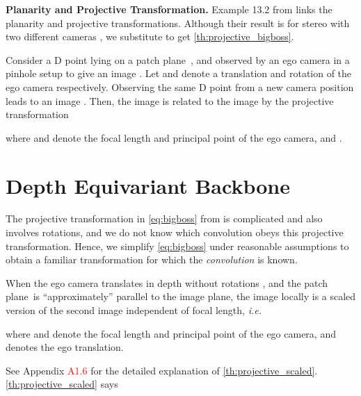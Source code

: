 \documentclass[runningheads]{llncs}
\newcommand{\threeD}{D}
\newcommand{\Equivariant} {Equivariant}
\newcommand{\DepthEquivariant} {Depth \Equivariant}
\newcommand{\plane}{patch plane}
\newcommand{\transformation}{transformation}
\newcommand{\thatIs}{\textit{i.e.}}
\newcommand{\noIndentHeading}[1]{\noindent\textbf{#1}}
\newcommand{\refSupApp}[1]{Appendix \textcolor{red}{A#1}}
\begin{document}
\noIndentHeading{Planarity and Projective Transformation.}                              
        Example 13.2 from \cite{hartley2003multiple} links the planarity and projective transformations.
        Although their result is for stereo with two different cameras , we substitute  to get \cref{th:projective_bigboss}. 
        \begin{theorem}\label{th:projective_bigboss}\cite{hartley2003multiple}
            Consider a \threeD{} point lying on a \plane~, and observed by an ego camera in a pinhole setup to give an image . 
            Let  and  denote a translation and rotation of the ego camera respectively. 
            Observing the same \threeD{} point from a new camera position leads to an image . 
            Then, the image  is related to the image  by the projective \transformation{} 
            
             where  and  denote the 
            focal length and principal point of the ego camera, and  . 
        \end{theorem}



\section{\DepthEquivariant{} Backbone}\label{sec:proposed}
    The projective transformation in \cref{eq:bigboss} from \cite{hartley2003multiple} is complicated and also involves rotations, and we do not know which convolution obeys this projective \transformation. 
    Hence, we simplify \cref{eq:bigboss} under reasonable assumptions to obtain a familiar \transformation{} for which the \textit{convolution} is known.
        \begin{corollary}\label{th:projective_scaled}
When the ego camera translates in depth without rotations 
            ,
            and the \plane~is ``approximately'' parallel to the image plane, the image  locally is a scaled version of the second image  independent of focal length, \thatIs
            
            where  and  denote the 
            focal length and principal point of the ego camera, and  denotes the ego translation.
        \end{corollary}
See \refSupApp{1.6} for the detailed explanation of \cref{th:projective_scaled}.
        \cref{th:projective_scaled} says
        
\end{document}
